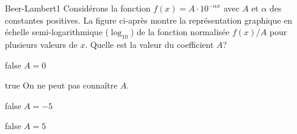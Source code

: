         \begin{question}{27}{Beer-Lambert}{1}{}
            Considérons la fonction $f(x) = A\cdot 10^{-\alpha x}$ avec $A$ et $\alpha$ des constantes positives. La figure ci-après montre la représentation graphique en échelle semi-logarithmique ($\log_{10}$) de la fonction normalisée $f(x)/A$ pour plusieurs valeurs de $x$. Quelle est la valeur du coefficient $A$?
            \begin{figure}
             \end{figure}
        \end{question}
        \begin{reponses}
            \item[false] $A = 0$
		    \item[true] On ne peut pas connaître $A$.
		    \item[false] $A = \num{-5}$
		    \item[false] $A = \num{5}$
		    \end{reponses}
